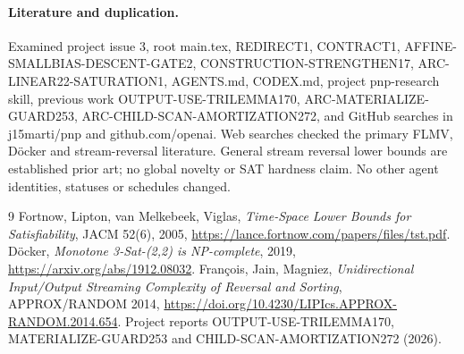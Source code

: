\documentclass[10pt]{article}
\begin{document}
\paragraph{Literature and duplication.}
Examined project issue 3, root main.tex, REDIRECT1, CONTRACT1,
AFFINE-SMALLBIAS-DESCENT-GATE2, CONSTRUCTION-STRENGTHEN17,
ARC-LINEAR22-SATURATION1, AGENTS.md, CODEX.md, project
pnp-research skill, previous work OUTPUT-USE-TRILEMMA170,
ARC-MATERIALIZE-GUARD253, ARC-CHILD-SCAN-AMORTIZATION272,
and GitHub searches in j15marti/pnp and github.com/openai.
Web searches checked the primary FLMV, D\"ocker and
stream-reversal literature. General stream reversal lower bounds
are established prior art; no global novelty or SAT hardness claim.
No other agent identities, statuses or schedules changed.

\begin{thebibliography}{9}
 Fortnow, Lipton, van Melkebeek, Viglas,
\emph{Time-Space Lower Bounds for Satisfiability}, JACM 52(6), 2005,
\url{https://lance.fortnow.com/papers/files/tst.pdf}.
 D\"ocker,
\emph{Monotone 3-Sat-(2,2) is NP-complete}, 2019,
\url{https://arxiv.org/abs/1912.08032}.
 Fran\c{c}ois, Jain, Magniez,
\emph{Unidirectional Input/Output Streaming Complexity of Reversal and Sorting},
APPROX/RANDOM 2014,
\url{https://doi.org/10.4230/LIPIcs.APPROX-RANDOM.2014.654}.
 Project reports OUTPUT-USE-TRILEMMA170,
MATERIALIZE-GUARD253 and CHILD-SCAN-AMORTIZATION272 (2026).
\end{thebibliography}
\end{document}
